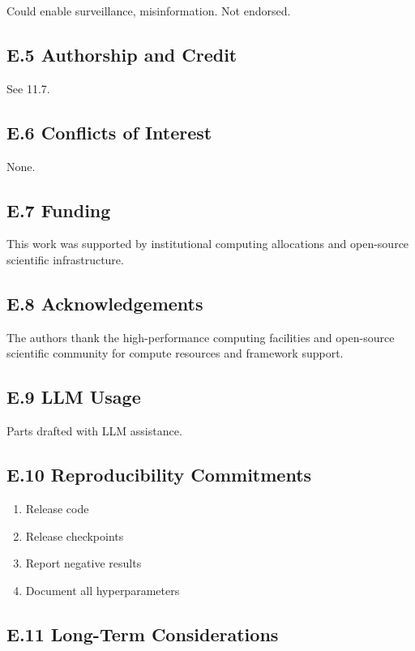 Could enable surveillance, misinformation. Not endorsed.

\subsection{E.5 Authorship and Credit}

See  11.7.

\subsection{E.6 Conflicts of Interest}

None.

\subsection{E.7 Funding}

This work was supported by institutional computing allocations and open-source scientific infrastructure.

\subsection{E.8 Acknowledgements}

The authors thank the high-performance computing facilities and open-source scientific community for compute resources and framework support.

\subsection{E.9 LLM Usage}

Parts drafted with LLM assistance.

\subsection{E.10 Reproducibility Commitments}

\begin{enumerate}
\item Release code
\item Release checkpoints
\item Report negative results
\item Document all hyperparameters

\end{enumerate}
\subsection{E.11 Long-Term Considerations}

